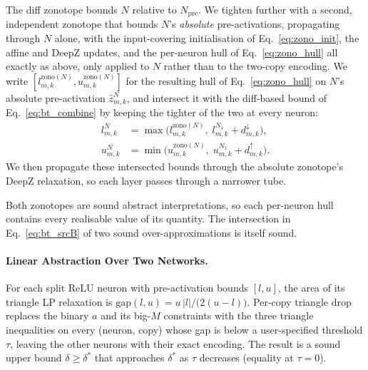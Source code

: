 \documentclass[11pt]{article}
\newcommand{\dexact}{\delta^*}
\begin{document}
The diff zonotope bounds $N$ relative to $N_\text{pre}$. We tighten further with a second, 
independent zonotope that bounds $N$'s \emph{absolute} pre-activations, propagating through $N$ 
alone, with the input-covering initialisation of Eq.~\eqref{eq:zono_init}, the affine and DeepZ
updates, and the per-neuron hull of Eq.~\eqref{eq:zono_hull} all exactly as above, only applied to $N$ rather than to the two-copy encoding. We write
$[l^{\mathrm{zono}(N)}_{m,k}, u^{\mathrm{zono}(N)}_{m,k}]$ for the resulting hull 
of Eq.~\eqref{eq:zono_hull} on $N$'s absolute pre-activation $\hat z^{N}_{m,k}$, 
and intersect it with the diff-based bound of Eq.~\eqref{eq:bt_combine} by 
keeping the tighter of the two at every neuron:
\begin{align}
  l^{N}_{m,k} &= \max\!\bigl(l^{\mathrm{zono}(N)}_{m,k},\; l^{N_1}_{m,k} + d^\downarrow_{m,k}\bigr), \nonumber\\
  u^{N}_{m,k} &= \min\!\bigl(u^{\mathrm{zono}(N)}_{m,k},\; u^{N_1}_{m,k} + d^\uparrow_{m,k}\bigr).
  \label{eq:bt_srcB}
\end{align}
We then propagate these intersected bounds through the absolute zonotope's DeepZ relaxation, so each layer passes through a narrower tube.

Both zonotopes are sound abstract interpretations, so each per-neuron hull contains 
every realisable value of its quantity. The intersection in Eq.~\eqref{eq:bt_srcB} of 
two sound over-approximations is itself sound.

\paragraph{Linear Abstraction Over Two Networks.}
\label{sec:tech:transfer_relax}

For each split ReLU neuron with pre-activation bounds $[l, u]$, the area of its triangle LP relaxation is $\mathrm{gap}(l, u) = u\,|l| / \bigl(2(u - l)\bigr)$. Per-copy triangle drop replaces the binary $a$ and its big-$M$ constraints with the three triangle inequalities on every (neuron, copy) whose gap is below a user-specified threshold $\tau$, leaving the other neurons with their exact encoding. The result is a sound upper bound $\delta \ge \dexact$ that approaches $\dexact$ as $\tau$ decreases (equality at $\tau = 0$).
\end{document}
